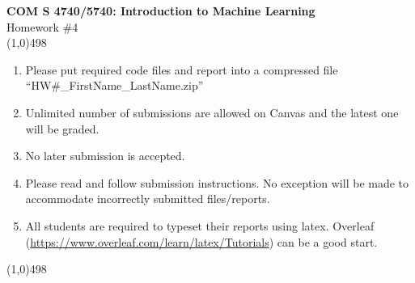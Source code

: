 \documentclass[11pt]{article}
\begin{document}
\begin{center}
{\Large \textbf{COM S 4740/5740: Introduction to Machine Learning}\\Homework \#4}\\
\linethickness{1mm}\line(1,0){498}
\begin{enumerate}
\item Please put required code files and report into a
compressed file ``HW\#\_FirstName\_LastName.zip''
\item Unlimited number of submissions are
allowed on Canvas and the latest one will be graded.
\item {\color{red} No later submission is accepted.}
\item Please read and follow submission instructions. No exception
will be made to accommodate incorrectly submitted files/reports.
\item All students are required to typeset their reports using
latex. Overleaf
(\url{https://www.overleaf.com/learn/latex/Tutorials}) can be a
good start.
\end{enumerate}
\linethickness{1mm}\line(1,0){498}
\end{center}
\end{document}
